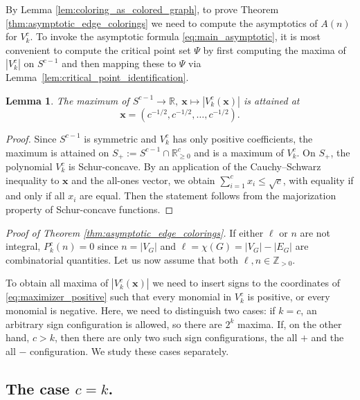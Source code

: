 \documentclass[a4paper,oneside]{amsart}
\newcommand{\bb}[1]{\boldsymbol{#1}}
\numberwithin{theorem}{section}
\newtheorem{lemma}[theorem]{Lemma}
\theoremstyle{remark}
\newcommand{\R}{\mathbb{R}}
\newcommand{\Z}{\mathbb{Z}}
\newcommand{\cE}{{P}}
\begin{document}
By Lemma \ref{lem:coloring_as_colored_graph}, to prove Theorem \ref{thm:asymptotic_edge_colorings} we need to compute the asymptotics of $A(n)$ for $V^{c}_k$. To invoke the asymptotic formula \eqref{eq:main_asymptotic}, it is most convenient to compute the critical point set $\Psi$ by first computing the maxima of $|V^c_k|$ on $S^{c-1}$ and then mapping these to $\Psi$ via Lemma~\ref{lem:critical_point_identification}.

\begin{lemma}
  \label{lem:max_all_coordinates_equal}
  The maximum of $S^{c-1} \rightarrow \R,~ \bb{x} \mapsto |V^{c}_k(\bb{x})|$ is attained at 
  \begin{equation} 
  \label{eq:maximizer_positive}
    \bb{x} = (c^{-1/2},c^{-1/2},\dots,c^{-1/2}).
  \end{equation}
\end{lemma}

\begin{proof}
  Since $S^{c-1}$ is symmetric and $V^c_k$ has only positive coefficients, the maximum is attained on $S_+ := S^{c-1}\cap \R^c_{\geq 0}$ and is a maximum of $V^c_k$. On $S_+$, the polynomial $V^c_k$ is Schur-concave. By an application of the Cauchy--Schwarz inequality to $\bb{x}$ and the all-ones vector, we obtain $\sum_{i=1}^{c} x_i \leq \sqrt{c}$, with equality if and only if all $x_i$ are equal. Then the statement follows from the majorization property of Schur-concave functions.
\end{proof}

\textit{Proof of Theorem \ref{thm:asymptotic_edge_colorings}.} If either $\ell$ or $n$ are not integral, $\cE^{c}_k(n) = 0$ since $n = |V_G|$ and $\ell = \chi(G) = |V_G| - |E_G|$ are combinatorial quantities. Let us now assume that both $\ell, n\in \Z_{>0}$.\par
To obtain all maxima of $|V^{c}_k(\bb{x})|$ we need to insert signs to the coordinates of \eqref{eq:maximizer_positive} such that every monomial in $V^c_k$ is positive, or every monomial is negative. Here, we need to distinguish two cases: if $k=c$, an arbitrary sign configuration is allowed, so there are $2^k$ maxima. If, on the other hand, $c>k$, then there are only two such sign configurations, the all $+$ and the all $-$ configuration. We study these cases separately.


\subsection*{The case $c=k$.}
\end{document}
